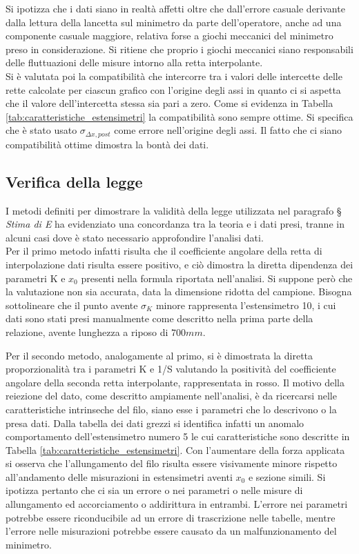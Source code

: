 \documentclass[a4paper,11pt,oneside]{article}
\begin{document}
Si ipotizza che i dati siano in realtà affetti oltre che dall'errore casuale derivante dalla lettura della lancetta sul minimetro da parte dell'operatore, anche ad una componente casuale maggiore, relativa forse a giochi meccanici del minimetro preso in considerazione. Si ritiene che proprio i giochi meccanici siano responsabili delle fluttuazioni delle misure intorno alla retta interpolante.\\
Si è valutata poi la compatibilità che intercorre tra i valori delle intercette delle rette calcolate per ciascun grafico con l'origine degli assi in quanto ci si aspetta che il valore dell'intercetta stessa sia pari a zero. Come si evidenza in Tabella \ref{tab:caratteristiche_estensimetri} la compatibilità sono sempre ottime. Si specifica che è stato usato $\sigma_{\Delta x, post}$ come errore nell'origine degli assi. Il fatto che ci siano compatibilità ottime dimostra la bontà dei dati.


\subsection{Verifica della legge}
I metodi definiti per dimostrare la validità della legge utilizzata nel paragrafo \S \textit{ Stima di E} ha evidenziato una concordanza tra la teoria e i dati presi, tranne in alcuni casi dove è stato necessario approfondire l'analisi dati.\\
Per il primo metodo infatti risulta che il coefficiente angolare della retta di interpolazione dati risulta essere positivo, e ciò dimostra la diretta dipendenza dei parametri K e $x_0$ presenti nella formula riportata nell'analisi. Si suppone però che la valutazione non sia accurata, data la dimensione ridotta del campione.
Bisogna sottolineare che il punto avente $\sigma_K$ minore rappresenta l'estensimetro 10, i cui dati sono stati presi manualmente come descritto nella prima parte della relazione, avente lunghezza a riposo di $700\si{mm}$.


Per il secondo metodo, analogamente al primo, si è dimostrata la diretta proporzionalità tra i parametri K e 1/S  valutando la positività del coefficiente angolare della seconda retta interpolante, rappresentata in rosso. Il motivo della reiezione del dato, come descritto ampiamente nell'analisi, è da ricercarsi nelle caratteristiche intrinseche del filo, siano esse i parametri che lo descrivono o la presa dati.
Dalla tabella dei dati grezzi si identifica infatti un anomalo comportamento dell'estensimetro numero 5 le cui caratteristiche sono descritte in Tabella \ref{tab:caratteristiche_estensimetri}. Con l'aumentare della forza applicata si osserva che l'allungamento del filo risulta essere visivamente minore rispetto all'andamento delle misurazioni in estensimetri aventi $x_{0}$ e sezione simili. 
Si ipotizza pertanto che ci sia un errore o nei parametri o nelle misure di allungamento ed accorciamento o addirittura in entrambi. L'errore nei parametri potrebbe essere riconducibile ad un errore di trascrizione nelle tabelle, mentre l'errore nelle misurazioni potrebbe essere causato da un malfunzionamento del minimetro.\\
\end{document}
